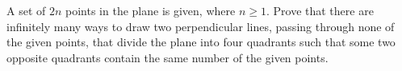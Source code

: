 A set of $2n$ points in the plane is given, where $n\ge1$. Prove that there are infinitely many ways to draw two perpendicular lines, passing through none of the given points, that divide the plane into four quadrants such that some two opposite quadrants contain the same number of the given points.

